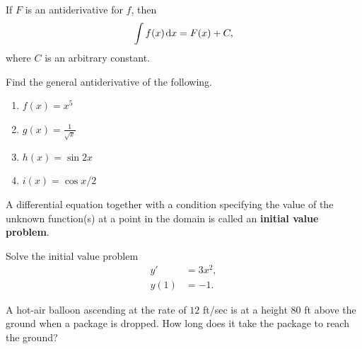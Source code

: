 \begin{theorem}
If $F$ is an antiderivative for $f$, then 
\begin{equation*}
\int f(x)\mkern 2mu \mathrm{d} x = F(x)+C,
\end{equation*}
where $C$ is an arbitrary constant.
\end{theorem}

\begin{example}
Find the general antiderivative of the following.
\begin{enumerate}
\item $f(x)=x^5$
\vfill
\item $g(x) = \frac{1}{\sqrt x}$
\vfill
\item $h(x) = \sin 2x$
\vfill
\item $i(x) = \cos x/2$
\vfill
\end{enumerate}
\end{example}

\newpage

\begin{definition}
A differential equation together with a condition specifying the value of the unknown function(s) at a point in the domain is called an \textbf{initial value problem}.
\end{definition}

\begin{example}
Solve the initial value problem 
\begin{align*}
y'&=3x^2,\\ 
y(1)&=-1.
\end{align*}
\end{example}

\newpage

\begin{example}
A hot-air balloon ascending at the rate of $12$ \si{ft/sec} is at a height $80$ \si{ft} above the ground when a package is dropped.
How long does it take the package to reach the ground?
\end{example}
